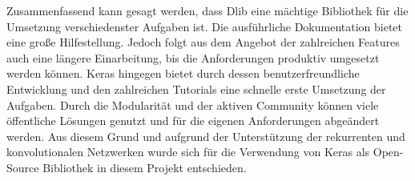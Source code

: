 \documentclass[12pt, a4paper]{report}
\begin{document}
%  
Zusammenfassend kann gesagt werden, dass Dlib eine mächtige Bibliothek für die Umsetzung verschiedenster Aufgaben ist. Die ausführliche Dokumentation bietet eine große Hilfestellung. Jedoch folgt aus dem Angebot der zahlreichen Features auch eine längere Einarbeitung, bis die Anforderungen produktiv umgesetzt werden können.\newline
Keras hingegen bietet durch dessen benutzerfreundliche Entwicklung und den zahlreichen Tutorials eine schnelle erste Umsetzung der Aufgaben. Durch die Modularität und der aktiven Community können viele öffentliche Lösungen genutzt und für die eigenen Anforderungen abgeändert werden. 
Aus diesem Grund und aufgrund der Unterstützung der rekurrenten und konvolutionalen Netzwerken wurde sich für die Verwendung von Keras als Open-Source Bibliothek in diesem Projekt entschieden.
\end{document}
